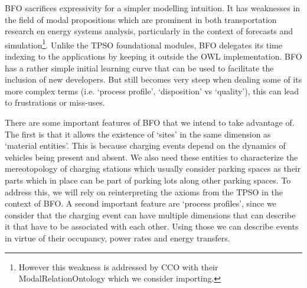 BFO sacrifices expressivity for a simpler modelling intuition. It has
weaknesses in the field of modal propositions which are prominent in both
transportation research en energy systems analysis, particularly in the context
of forecasts and simulation\footnote{However this weakness is addressed by CCO
with their ModalRelationOntology which we consider importing. }. Unlike the
TPSO foundational modules, BFO delegates its time indexing to the applications
by keeping it outside the OWL implementation. BFO has a rather simple initial
learning curve that can be used to facilitate the inclusion of new developers.
But still becomes very steep when dealing some of its more complex terms (i.e.
`process profile', `disposition' vs `quality'), this can lead to frustrations
or miss-uses.

There are some important features of BFO that we intend to take advantage of.
The first is that it allows the existence of `sites' in the same dimension as
`material entities'. This is because charging events depend on the dynamics of
vehicles being present and absent. We also need these entities to characterize
the mereotopology of charging stations which usually consider parking spaces as
their parts which in place can be part of parking lots along other parking
spaces. To address this, we will rely on reinterpreting the axioms from the
TPSO in the context of BFO. A second important feature are `process profiles',
since we consider that the charging event can have multiple dimensions that can
describe it that have to be associated with each other. Using those we can
describe events in virtue of their occupancy, power rates and energy transfers.

